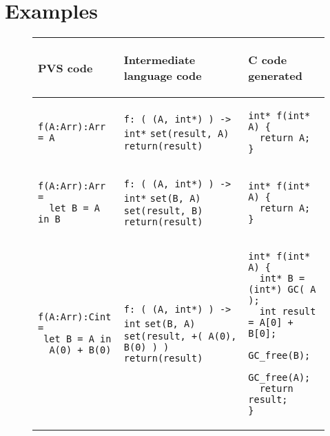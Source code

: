 \documentclass[12pt,a4paper]{article}
\newcommand{\cl}[1]{\texttt{#1}}
\begin{document}
\newpage
\section{Examples}


\begin{figure}[!ht]
\begin{tabular}{|p{5.2cm}|p{5.8cm}|p{6cm}|}
\hline
\begin{center}
PVS code
\end{center} &
\begin{center}
Intermediate language code
\end{center} &
\begin{center}
C code generated
\end{center} \\ \hline

\begin{lstlisting}
f(A:Arr):Arr = A
\end{lstlisting} &
\cl{f: ( (A, int*) ) -> int*} \newline
\cl{set(result, A)} \newline
\cl{return(result)} &
\begin{lstlisting}
int* f(int* A) {
  return A;
}
\end{lstlisting} \\ \hline

\begin{lstlisting}
f(A:Arr):Arr =
  let B = A in B
\end{lstlisting} &
\cl{f: ( (A, int*) ) -> int*} \newline
\cl{set(B, A)} \newline
\cl{set(result, B)} \newline
\cl{return(result)} &
\begin{lstlisting}
int* f(int* A) {
  return A;
}
\end{lstlisting} \\ \hline

\begin{lstlisting}
f(A:Arr):Cint =
 let B = A in
  A(0) + B(0)
\end{lstlisting} &
\cl{f: ( (A, int*) ) -> int} \newline
\cl{set(B, A)} \newline
\cl{set(result, +( A(0), B(0) ) )} \newline
\cl{return(result)} &
\begin{lstlisting}
int* f(int* A) {
  int* B = (int*) GC( A );
  int result = A[0] + B[0];
  GC_free(B);
  GC_free(A);
  return result;
}
\end{lstlisting} \\ \hline


\end{tabular}
\end{figure}
\end{document}
